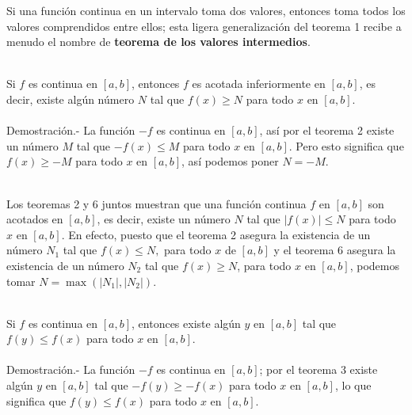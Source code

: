 Si una función continua en un intervalo toma dos valores, entonces toma todos los valores comprendidos entre ellos; esta ligera generalización del teorema 1 recibe a menudo el nombre de \textbf{teorema de los valores intermedios}.\\\\ 

\begin{teo}
    Si $f$ es continua en $[a,b]$, entonces $f$ es acotada inferiormente en $[a,b]$, es decir, existe algún número $N$ tal que $f(x)\geq N$ para todo $x$ en $[a,b]$.\\\\
    Demostración.-\; La función $-f$ es continua en $[a,b]$, así por el teorema 2 existe un número $M$ tal que $-f(x)\leq M$ para todo $x$ en $[a,b]$. Pero esto significa que $f(x)\geq -M$ para todo $x$ en $[a,b]$, así podemos poner $N=-M$.\\\\
\end{teo}

Los teoremas 2 y 6 juntos muestran  que una función continua $f$ en $[a,b]$ son acotados en $[a,b]$, es decir, existe un número $N$ tal que $|f(x)|\leq N$ para todo $x$ en $[a,b]$. En efecto, puesto que el teorema 2 asegura la existencia de un número $N_1$ tal que $f(x)\leq N,$ para todo $x$ de $[a,b]$ y el teorema 6 asegura la existencia de un número $N_2$ tal que $f(x)\geq N$, para todo $x$ en $[a,b]$, podemos tomar $N=\max(|N_1|,|N_2|)$.\\\\

\begin{teo}
    Si $f$ es continua en $[a,b]$, entonces existe algún $y$ en $[a,b]$ tal que $f(y)\leq f(x)$ para todo $x$ en $[a,b]$.\\\\
    Demostración.-\; La función $-f$ es continua en $[a,b]$; por el teorema 3 existe algún $y$ en $[a,b]$ tal que $-f(y)\geq -f(x)$ para todo $x$ en $[a,b]$, lo que significa que $f(y)\leq f(x)$ para todo $x$ en $[a,b]$.\\\\
\end{teo}

